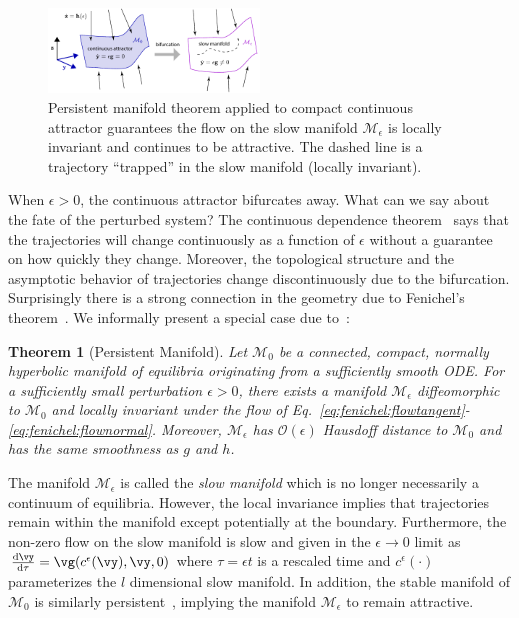 \documentclass{article} %
\newcounter{ct}
\newcommand{\dm}[1]{\ensuremath{\mathrm{d}{#1}}} %
\newcommand{\RN}[2]{\frac{\dm{#1}}{\dm{#2}}} %
\newcommand{\manifold}{\mathcal{M}}
\newtheorem{theorem}{Theorem}
\theoremstyle{definition}
\theoremstyle{remark}
\renewcommand{\cite}{\citep}
\begin{document}
\setlength\belowcaptionskip{-5ex}
\begin{figure}
  \centering
  \includegraphics[width=0.5\textwidth]{FenichelThm}
  \caption{
    Persistent manifold theorem applied to compact continuous attractor guarantees the flow on the slow manifold \(\manifold_\epsilon\) is locally invariant and continues to be attractive.
    The dashed line is a trajectory ``trapped'' in the slow manifold (locally invariant). %
  }\label{fig:fenichel}
\end{figure}


When \(\epsilon > 0\), the continuous attractor bifurcates away.
What can we say about the fate of the perturbed system?
The continuous dependence theorem~\citep{Chicone2006} says that the trajectories will change continuously as a function of \(\epsilon\) without a guarantee on how quickly they change.
Moreover, the topological structure and the asymptotic behavior of trajectories change discontinuously due to the bifurcation.
Surprisingly there is a strong connection in the geometry due to Fenichel's theorem~\cite{fenichel1971}.
We informally present a special case due to~\citet{Jones1995}:

\setlength\belowcaptionskip{2ex}

\begin{theorem}[Persistent Manifold]
Let \(\manifold_0\) be a connected, compact, normally hyperbolic manifold of equilibria originating from a sufficiently smooth ODE.
For a sufficiently small perturbation \(\epsilon > 0\), there exists a manifold \(\manifold_\epsilon\) diffeomorphic to \(\manifold_0\) and locally invariant under the flow of Eq.~\eqref{eq:fenichel:flowtangent}-\eqref{eq:fenichel:flownormal}.
Moreover, \(\manifold_\epsilon\) has \(\mathcal{O}(\epsilon)\) Hausdoff distance to \(\manifold_0\) and has the same smoothness as \(g\) and \(h\). %
\end{theorem}

The manifold \(\manifold_\epsilon\) is called the \emph{slow manifold} which is no longer necessarily a continuum of equilibria.
However, the local invariance implies that trajectories remain within the manifold except potentially at the boundary.
Furthermore, the non-zero flow on the slow manifold is slow and given in the \(\epsilon \to 0\) limit as \(\RN{\vy}{\tau} = \vg(c^\epsilon(\vy), \vy, 0)\) where \(\tau = \epsilon t\) is a rescaled time and \(c^\epsilon(\cdot)\) parameterizes the \(l\) dimensional slow manifold.
In addition, the stable manifold of \(\manifold_0\) is similarly persistent~\cite{Jones1995}, implying the manifold \(\manifold_\epsilon\) to remain attractive.
\end{document}
